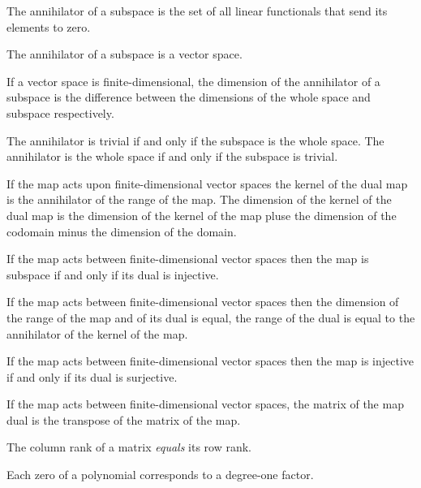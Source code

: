 \begin{multicols}{3}
  The annihilator of a subspace is the set of all linear functionals that send its elements to zero.

  The annihilator of a subspace is a vector space.

  If a vector space is finite-dimensional, the dimension of the annihilator of a subspace is the difference
  between the dimensions of the whole space and subspace respectively.

  The annihilator is trivial if and only if the subspace is the whole space.
  The annihilator is the whole space if and only if the subspace is trivial.

  If the map acts upon finite-dimensional vector spaces
  the kernel of the dual map is the annihilator of the range of the map.
  The dimension of the kernel of the dual map is the dimension of the kernel
  of the map pluse the dimension of the codomain minus the dimension of the domain.
  
  If the map acts between finite-dimensional vector spaces then the map is subspace if and only if its dual is injective.

  If the map acts between finite-dimensional vector spaces then the dimension of the range of the map and of its dual is equal,
  the range of the dual is equal to the annihilator of the kernel of the map.

  If the map acts between finite-dimensional vector spaces then the map is injective if and only if its dual is surjective.

  If the map acts between finite-dimensional vector spaces, the matrix of the map dual is the transpose of the matrix of the map.
  
  The column rank of a matrix \textit{equals} its row rank.

  Each zero of a polynomial corresponds to a degree-one factor.
  
  
  
\end{multicols}


